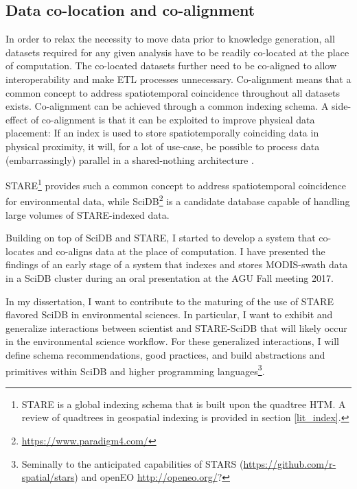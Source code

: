 \documentclass[a4paper,10pt]{article}
\begin{document}
\newpage

\subsection{Data co-location and co-alignment}
In order to relax the necessity to move data prior to knowledge generation, all datasets required for any given analysis have to be readily co-located at the place of computation. 
The co-located datasets further need to be co-aligned to allow interoperability \citep{Kuo2017, Rilee2016} and make \gls{ETL} processes unnecessary.
Co-alignment means that a common concept to address spatiotemporal coincidence throughout all datasets exists. 
Co-alignment can be achieved through a common indexing schema. 
A side-effect of co-alignment is that it can be exploited to improve physical data placement: If an index is used to 
store spatiotemporally coinciding data in physical proximity, it will, for a lot of use-case, be possible to process data (embarrassingly) parallel in a shared-nothing architecture \citep{Kuo2017}.

\gls{STARE}\footnote{STARE is a global indexing schema that is built upon the quadtree \gls{HTM}. A review of quadtrees in geospatial indexing is provided in section \ref{lit_index}.} \citep{Kuo2017} provides such a common concept to address spatiotemporal coincidence for environmental data, while SciDB\footnote{\url{https://www.paradigm4.com/}} is a candidate database capable of handling large volumes of \gls{STARE}-indexed data.

Building on top of SciDB and \gls{STARE}, I started to develop a system that co-locates and co-aligns data at the place of computation. I have presented the findings of an early stage of a system that indexes and stores \gls{MODIS}-swath data in a SciDB cluster during an oral presentation at the \gls{AGU} Fall meeting 2017.

In my dissertation, I want to contribute to the maturing of the use of \gls{STARE} flavored SciDB in environmental sciences. In particular, I want to exhibit and generalize interactions between scientist and \gls{STARE}-SciDB that will likely occur in the environmental science workflow. For these generalized interactions, I will define schema recommendations, good practices, and build abstractions and primitives within SciDB and higher programming languages\footnote{Seminally to the anticipated capabilities of STARS (\url{https://github.com/r-spatial/stars}) and openEO \url{http://openeo.org/}?}.
\end{document}
